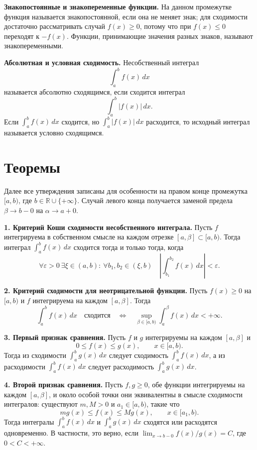 \documentclass[12pt,a4paper]{article}
\newcommand{\R}{\mathbb{R}}
\newcommand{\eps}{\varepsilon}
\newcommand{\dd}{\,d}
\begin{document}
\textbf{Знакопостоянные и знакопеременные функции.}
На данном промежутке функция называется знакопостоянной, если она не меняет
знак; для сходимости достаточно рассматривать случай \(f(x)\ge0\), потому что
при \(f(x)\le0\) переходят к \(-f(x)\). Функции, принимающие значения разных
знаков, называют знакопеременными.

\textbf{Абсолютная и условная сходимость.}
Несобственный интеграл
\[
  \int_a^b f(x)\dd x
\]
называется абсолютно сходящимся, если сходится интеграл
\[
  \int_a^b |f(x)|\dd x.
\]
Если \(\int_a^b f(x)\dd x\) сходится, но \(\int_a^b |f(x)|\dd x\) расходится,
то исходный интеграл называется условно сходящимся.

\section*{Теоремы}

Далее все утверждения записаны для особенности на правом конце промежутка
\([a,b)\), где \(b\in\R\cup\{+\infty\}\). Случай левого конца получается
заменой предела \(\beta\to b-0\) на \(\alpha\to a+0\).

\textbf{1. Критерий Коши сходимости несобственного интеграла.}
Пусть \(f\) интегрируема в собственном смысле на каждом отрезке
\([a,\beta]\subset[a,b)\). Тогда интеграл \(\int_a^b f(x)\dd x\) сходится
тогда и только тогда, когда
\[
  \forall\eps>0\ \exists\xi\in(a,b):\
  \forall b_1,b_2\in(\xi,b)\quad
  \left|\int_{b_1}^{b_2} f(x)\dd x\right|<\eps .
\]

\textbf{2. Критерий сходимости для неотрицательной функции.}
Пусть \(f(x)\ge0\) на \([a,b)\) и \(f\) интегрируема на каждом
\([a,\beta]\). Тогда
\[
  \int_a^b f(x)\dd x
  \quad\text{сходится}
  \quad\Longleftrightarrow\quad
  \sup_{\beta\in[a,b)}\int_a^\beta f(x)\dd x<+\infty.
\]

\textbf{3. Первый признак сравнения.}
Пусть \(f\) и \(g\) интегрируемы на каждом \([a,\beta]\) и
\[
  0\le f(x)\le g(x),\qquad x\in[a,b).
\]
Тогда из сходимости \(\int_a^b g(x)\dd x\) следует сходимость
\(\int_a^b f(x)\dd x\), а из расходимости \(\int_a^b f(x)\dd x\) следует
расходимость \(\int_a^b g(x)\dd x\).

\textbf{4. Второй признак сравнения.}
Пусть \(f,g\ge0\), обе функции интегрируемы на каждом \([a,\beta]\), и около
особой точки они эквивалентны в смысле сходимости интегралов:
существуют \(m,M>0\) и \(a_1\in[a,b)\), такие что
\[
  m g(x)\le f(x)\le M g(x),\qquad x\in[a_1,b).
\]
Тогда интегралы \(\int_a^b f(x)\dd x\) и \(\int_a^b g(x)\dd x\) сходятся или
расходятся одновременно. В частности, это верно, если
\(\lim_{x\to b-0}f(x)/g(x)=C\), где \(0<C<+\infty\).
\end{document}
